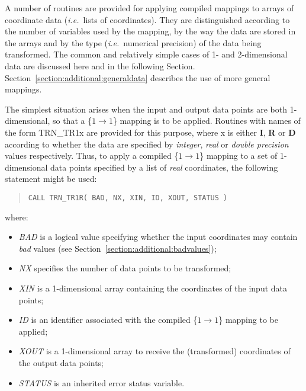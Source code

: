 \documentclass[twoside,11pt]{article}
\newcommand{\name}[1]{\mbox{\small{#1}}}
\newcommand{\fortvar}[1]{\mbox{\emph{#1}}}
\begin{document}
\label{section:simple:1ddata}

A number of routines are provided for applying compiled mappings to arrays
of coordinate data (\emph{i.e.}\ lists of coordinates).
They are distinguished according to the number of variables used by the
mapping, by the way the data are stored in the arrays and by the type 
(\emph{i.e.}\ numerical precision) of the data being transformed. 
The common and relatively simple cases of 1- and 2-dimensional data are
discussed here and in the following Section. 
Section~\ref{section:additional:generaldata} describes the use of more
general mappings. 

The simplest situation arises when the input and output data points are
both 1-dimensional, so that a \mbox{\{$1 \rightarrow 1$\}} mapping is
to be applied.  Routines with names of the form \name{TRN\_TR1x} are
provided for this purpose, where x is either \textbf{I}, \textbf{R} or
\textbf{D} according to whether the data are specified by
\emph{integer}, \emph{real} or \emph{double precision} values
respectively.  Thus, to apply a compiled \mbox{\{$1 \rightarrow 1$\}}
mapping to a set of 1-dimensional data points specified by a list of
\emph{real} coordinates, the following statement might be used:

\begin{quote}
\begin{verbatim}
CALL TRN_TR1R( BAD, NX, XIN, ID, XOUT, STATUS )
\end{verbatim}
\end{quote}

where:

\begin{itemize}

\item \fortvar{BAD} is a logical value specifying whether the input
coordinates may contain \emph{bad} values (see
Section~\ref{section:additional:badvalues}); 

\item \fortvar{NX} specifies the number of data points to be transformed;

\item \fortvar{XIN} is a 1-dimensional array containing the coordinates of
the input data points; 

\item \fortvar{ID} is an identifier associated with the compiled \mbox{\{$1
\rightarrow 1$\}} mapping to be applied; 

\item \fortvar{XOUT} is a 1-dimensional array to receive the (transformed)
coordinates of the output data points; 

\item \fortvar{STATUS} is an inherited error status variable.

\end{itemize}
\end{document}

